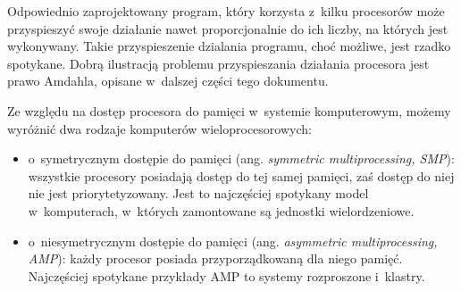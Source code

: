 \documentclass{mwart}
\begin{document}
	Odpowiednio zaprojektowany program,	który korzysta z~kilku procesorów może przyspieszyć swoje działanie nawet proporcjonalnie do ich liczby,
	na których jest wykonywany.	Takie przyspieszenie dzialania programu, choć możliwe, jest rzadko spotykane.
	Dobrą ilustracją problemu przyspieszania działania procesora jest prawo Amdahla, opisane w~dalszej części tego dokumentu.
\par
%
\indent
	Ze względu na dostęp procesora do pamięci w~systemie komputerowym, możemy wyróżnić dwa rodzaje komputerów wieloprocesorowych:
	\begin{itemize}
		\item o~symetrycznym dostępie do pamięci (ang. \emph{symmetric multiprocessing, SMP}): wszystkie procesory posiadają 
			dostęp do tej samej pamięci, zaś dostęp do niej nie jest priorytetyzowany. Jest to najczęściej spotykany model w~komputerach,
			w~których zamontowane są jednostki wielordzeniowe.
		\item o~niesymetrycznym dostępie do pamięci (ang. \emph{asymmetric multiprocessing, AMP}): każdy procesor posiada przyporządkowaną
		dla niego pamięć. Najczęściej spotykane przykłady AMP to systemy rozproszone i~klastry.
	\end{itemize}
\par
%
\end{document}
